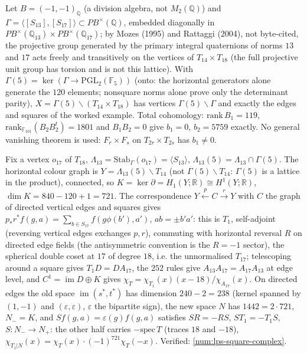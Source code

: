 \begin{proposition}
\label{prop:lps-square-complex-structure}
Let $B = (-1,-1)_{\mathbb Q}$ (a division algebra, not $M_2(\mathbb Q)$) and $\Gamma = \langle[S_{13}],[S_{17}]\rangle\subset PB^\times(\mathbb Q)$,
embedded diagonally in $PB^\times(\mathbb Q_{13})\times PB^\times(\mathbb Q_{17})$; by Mozes (1995) and Rattaggi (2004), not
byte-cited, the projective group generated by the primary integral quaternions of norms $13$ and $17$ acts freely and
transitively on the vertices of $T_{14}\times T_{18}$ (the full projective unit group has torsion and is not this lattice).
With $\Gamma(5) = \ker(\Gamma\to\mathrm{PGL}_2(\mathbb F_5))$ (onto: the horizontal generators alone generate the $120$ elements;
nonsquare norms alone prove only the determinant parity), $X = \Gamma(5)\backslash(T_{14}\times T_{18})$ has vertices
$\Gamma(5)\backslash\Gamma$ and exactly the edges and squares of the worked example. Total cohomology: $\mathrm{rank}\,B_1 = 119$,
$\mathrm{rank}_{\mathbb F_{101}}(B_2B_2^{t}) = 1801$ and $B_1B_2 = 0$ give $b_1 = 0$, $b_2 = 5759$ exactly. No general vanishing theorem
is used: $F_r\times F_s$ on $T_{2r}\times T_{2s}$ has $b_1\ne0$.
\end{proposition}

\begin{theorem}
\label{thm:lps-horizontal-h1-hecke}
Fix a vertex $o_{17}$ of $T_{18}$, $\Lambda_{13} = \mathrm{Stab}_\Gamma(o_{17}) = \langle S_{13}\rangle$, $\Lambda_{13}(5) = \Lambda_{13}\cap\Gamma(5)$.
The horizontal colour graph is $Y = \Lambda_{13}(5)\backslash T_{14}$ (not $\Gamma(5)\backslash T_{14}$: $\Gamma(5)$ is a lattice in the
product), connected, so $K = \ker\partial = H_1(Y;\mathbb R)\cong H^1(Y;\mathbb R)$, $\dim K = 840-120+1 = 721$. The correspondence
$Y\xleftarrow{p}C\xrightarrow{r}Y$ with $C$ the graph of directed vertical edges and squares gives $p_{*}r^{*}f(g,a) =
\sum_{b\in S_{17}}f(g\phi(b'),a')$, $ab = \pm b'a'$: this is $T_1$, self-adjoint (reversing vertical edges exchanges $p,r$), commuting
with horizontal reversal $R$ on directed edge fields (the antisymmetric convention is the $R = -1$ sector), the spherical
double coset at $17$ of degree $18$, i.e. the unnormalised $T_{17}$; telescoping around a square gives $T_1D = DA_{17}$, the
$252$ rules give $A_{13}A_{17} = A_{17}A_{13}$ at edge level, and $C^1 = \operatorname{im}D\oplus K$ gives
$\chi_T = \chi_{T_1}(x)(x-18)/\chi_{A_{17}}(x)$. On directed edges the old space $\operatorname{im}(s^{*},t^{*})$ has dimension
$240-2 = 238$ (kernel spanned by $(1,-1)$ and $(\varepsilon,\varepsilon)$, $\varepsilon$ the bipartite sign), the new space $N$ has
$1442 = 2\cdot721$, $N_- = K$, and $Sf(g,a) = \varepsilon(g)f(g,a)$ satisfies $SR = -RS$, $ST_1 = -T_1S$, $S: N_-\to N_+$: the other
half carries $-\mathrm{spec}\,T$ (traces $18$ and $-18$), $\chi_{T_1|N}(x) = \chi_T(x)\cdot(-1)^{721}\chi_T(-x)$. Verified:
\cref{num:lps-square-complex}.
\end{theorem}

